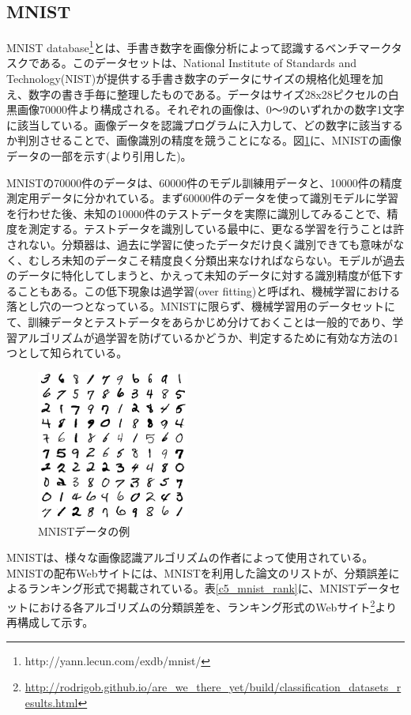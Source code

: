 \subsection{MNIST}
MNIST database\footnote{http://yann.lecun.com/exdb/mnist/}とは、手書き数字を画像分析によって認識するベンチマークタスクである。このデータセットは、National Institute of Standards and Technology(NIST)が提供する手書き数字のデータにサイズの規格化処理を加え、数字の書き手毎に整理したものである。データはサイズ28x28ピクセルの白黒画像70000件より構成される\cite{LeCun:1998:GLADR:0}。それぞれの画像は、0〜9のいずれかの数字1文字に該当している。画像データを認識プログラムに入力して、どの数字に該当するか判別させることで、画像識別の精度を競うことになる。図\ref{c5_mnist_ex}に、MNISTの画像データの一部を示す(\cite{LeCun:1998:GLADR:0}より引用した)。\par
MNISTの70000件のデータは、60000件のモデル訓練用データと、10000件の精度測定用データに分かれている。まず60000件のデータを使って識別モデルに学習を行わせた後、未知の10000件のテストデータを実際に識別してみることで、精度を測定する。テストデータを識別している最中に、更なる学習を行うことは許されない。分類器は、過去に学習に使ったデータだけ良く識別できても意味がなく、むしろ未知のデータこそ精度良く分類出来なければならない。モデルが過去のデータに特化してしまうと、かえって未知のデータに対する識別精度が低下することもある。この低下現象は過学習(over fitting)と呼ばれ、機械学習における落とし穴の一つとなっている。MNISTに限らず、機械学習用のデータセットにて、訓練データとテストデータをあらかじめ分けておくことは一般的であり、学習アルゴリズムが過学習を防げているかどうか、判定するために有効な方法の1つとして知られている。\par
\begin{figure}[tbp]
 \begin{center}
  \includegraphics[width=50mm]{img/c5/mnist_ex}
 \end{center}
 \caption{MNISTデータの例}
 \label{c5_mnist_ex}
\end{figure}
MNISTは、様々な画像認識アルゴリズムの作者によって使用されている。MNISTの配布Webサイトには、MNISTを利用した論文のリストが、分類誤差によるランキング形式で掲載されている。表\ref{c5_mnist_rank}に、MNISTデータセットにおける各アルゴリズムの分類誤差を、ランキング形式のWebサイト\footnote{\label{c5_rank}\url{http://rodrigob.github.io/are_we_there_yet/build/classification_datasets_results.html}}より再構成して示す。

